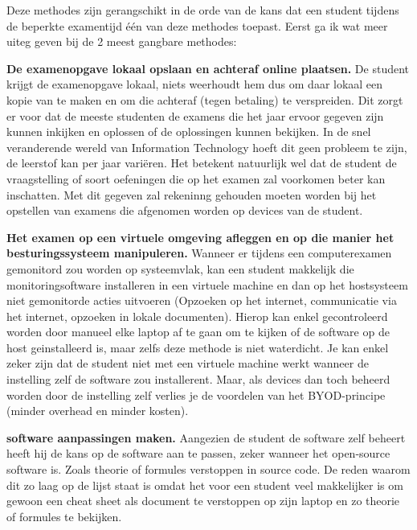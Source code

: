 Deze methodes zijn gerangschikt in de orde van de kans dat een student tijdens de beperkte examentijd \'{e}\'{e}n van deze methodes toepast. Eerst ga ik wat meer uiteg geven bij de 2 meest gangbare methodes: 

\textbf{De examenopgave lokaal opslaan en achteraf online plaatsen.} De student krijgt de examenopgave lokaal, niets weerhoudt hem dus om daar lokaal een kopie van te maken en om die achteraf (tegen betaling) te verspreiden. Dit zorgt er voor dat de meeste studenten de examens die het jaar ervoor gegeven zijn kunnen inkijken en oplossen of de oplossingen kunnen bekijken. In de snel veranderende wereld van Information Technology hoeft dit geen probleem te zijn, de leerstof kan per jaar vari\"{e}ren. Het betekent natuurlijk wel dat de student de vraagstelling of soort oefeningen die op het examen zal voorkomen beter kan inschatten. Met dit gegeven zal rekeninng gehouden moeten worden bij het opstellen van examens die afgenomen worden op devices van de student. 

\textbf{Het examen op een virtuele omgeving afleggen en op die manier het besturingssysteem manipuleren.} Wanneer er tijdens een computerexamen gemonitord zou worden op systeemvlak, kan een student makkelijk die monitoringsoftware installeren in een virtuele machine en dan op het hostsysteem niet gemonitorde acties uitvoeren (Opzoeken op het internet, communicatie via het internet, opzoeken in lokale documenten). Hierop kan enkel gecontroleerd worden door manueel elke laptop af te gaan om te kijken of de software op de host geinstalleerd is, maar zelfs deze methode is niet waterdicht. Je kan enkel zeker zijn dat de student niet met een virtuele machine werkt wanneer de instelling zelf de software zou installerent. Maar, als devices dan toch beheerd worden door de instelling zelf verlies je de voordelen van het BYOD-principe (minder overhead en minder kosten).

\textbf{software aanpassingen maken.} Aangezien de student de software zelf beheert heeft hij de kans op de software aan te passen, zeker wanneer het open-source software is. Zoals theorie of formules verstoppen in source code. De reden waarom dit zo laag op de lijst staat is omdat het voor een student veel makkelijker is om gewoon een cheat sheet als document te verstoppen op zijn laptop en zo theorie of formules te bekijken. 

